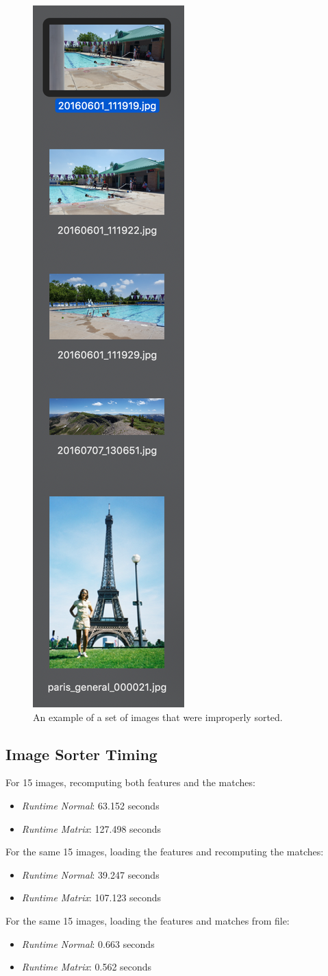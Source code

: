 \documentclass[12pt]{article}
\begin{document}
\begin{figure}[H]
	\centering
	\includegraphics[width=.2\textwidth]{images/wrong_match_1.png}
	\caption{An example of a set of images that were improperly sorted.}
\end{figure}

\subsection{Image Sorter Timing}
	For 15 images, recomputing both features and the matches: 
	\begin{itemize}
		\item \textit{Runtime Normal}: 63.152 seconds
		\item \textit{Runtime Matrix}: 127.498 seconds
	\end{itemize}
	
	
	
	For the same 15 images, loading the features and recomputing the matches: 
	\begin{itemize}
		\item \textit{Runtime Normal}: 39.247 seconds
		\item \textit{Runtime Matrix}: 107.123 seconds
	\end{itemize}

	For the same 15 images, loading the features and matches from file:
	\begin{itemize}
		\item \textit{Runtime Normal}: 0.663 seconds
		\item \textit{Runtime Matrix}: 0.562 seconds
	\end{itemize}
\end{document}
